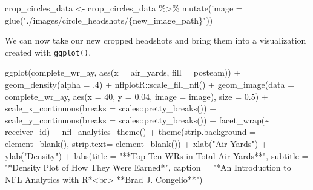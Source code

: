 \documentclass[
  letterpaper,
]{krantz}
\newenvironment{Shaded}{\begin{snugshade}}{\end{snugshade}}
\newcommand{\AttributeTok}[1]{\textcolor[rgb]{0.40,0.45,0.13}{#1}}
\newcommand{\DecValTok}[1]{\textcolor[rgb]{0.68,0.00,0.00}{#1}}
\newcommand{\FloatTok}[1]{\textcolor[rgb]{0.68,0.00,0.00}{#1}}
\newcommand{\FunctionTok}[1]{\textcolor[rgb]{0.28,0.35,0.67}{#1}}
\newcommand{\NormalTok}[1]{\textcolor[rgb]{0.00,0.23,0.31}{#1}}
\newcommand{\OtherTok}[1]{\textcolor[rgb]{0.00,0.23,0.31}{#1}}
\newcommand{\SpecialCharTok}[1]{\textcolor[rgb]{0.37,0.37,0.37}{#1}}
\newcommand{\StringTok}[1]{\textcolor[rgb]{0.13,0.47,0.30}{#1}}
\begin{document}
\begin{Shaded}
\begin{Highlighting}[]
\NormalTok{crop\_circles\_data }\OtherTok{\textless{}{-}}\NormalTok{ crop\_circles\_data }\SpecialCharTok{\%\textgreater{}\%}
  \FunctionTok{mutate}\NormalTok{(}\AttributeTok{image =} \FunctionTok{glue}\NormalTok{(}\StringTok{"./images/circle\_headshots/\{new\_image\_path\}"}\NormalTok{))}
\end{Highlighting}
\end{Shaded}

We can now take our new cropped headshots and bring them into a
visualization created with \texttt{ggplot()}.

\begin{Shaded}
\begin{Highlighting}[]
\FunctionTok{ggplot}\NormalTok{(complete\_wr\_ay, }\FunctionTok{aes}\NormalTok{(}\AttributeTok{x =}\NormalTok{ air\_yards, }\AttributeTok{fill =}\NormalTok{ posteam)) }\SpecialCharTok{+}
  \FunctionTok{geom\_density}\NormalTok{(}\AttributeTok{alpha =}\NormalTok{ .}\DecValTok{4}\NormalTok{) }\SpecialCharTok{+}
\NormalTok{  nflplotR}\SpecialCharTok{::}\FunctionTok{scale\_fill\_nfl}\NormalTok{() }\SpecialCharTok{+}
  \FunctionTok{geom\_image}\NormalTok{(}\AttributeTok{data =}\NormalTok{ complete\_wr\_ay, }\FunctionTok{aes}\NormalTok{(}\AttributeTok{x =} \DecValTok{40}\NormalTok{, }\AttributeTok{y =} \FloatTok{0.04}\NormalTok{,}
                                        \AttributeTok{image =}\NormalTok{ image),}
             \AttributeTok{size =} \FloatTok{0.5}\NormalTok{) }\SpecialCharTok{+}
  \FunctionTok{scale\_x\_continuous}\NormalTok{(}\AttributeTok{breaks =}\NormalTok{ scales}\SpecialCharTok{::}\FunctionTok{pretty\_breaks}\NormalTok{()) }\SpecialCharTok{+}
  \FunctionTok{scale\_y\_continuous}\NormalTok{(}\AttributeTok{breaks =}\NormalTok{ scales}\SpecialCharTok{::}\FunctionTok{pretty\_breaks}\NormalTok{()) }\SpecialCharTok{+}
  \FunctionTok{facet\_wrap}\NormalTok{(}\SpecialCharTok{\textasciitilde{}}\NormalTok{ receiver\_id) }\SpecialCharTok{+}
  \FunctionTok{nfl\_analytics\_theme}\NormalTok{() }\SpecialCharTok{+}
  \FunctionTok{theme}\NormalTok{(}\AttributeTok{strip.background =} \FunctionTok{element\_blank}\NormalTok{(),}
        \AttributeTok{strip.text=} \FunctionTok{element\_blank}\NormalTok{()) }\SpecialCharTok{+}
  \FunctionTok{xlab}\NormalTok{(}\StringTok{"Air Yards"}\NormalTok{) }\SpecialCharTok{+}
  \FunctionTok{ylab}\NormalTok{(}\StringTok{"Density"}\NormalTok{) }\SpecialCharTok{+}
  \FunctionTok{labs}\NormalTok{(}\AttributeTok{title =} \StringTok{"**Top Ten WRs in Total Air Yards**"}\NormalTok{,}
       \AttributeTok{subtitle =} \StringTok{"*Density Plot of How They Were Earned*"}\NormalTok{,}
       \AttributeTok{caption =} \StringTok{"*An Introduction to NFL Analytics with R*\textless{}br\textgreater{}}
\StringTok{       **Brad J. Congelio**"}\NormalTok{)}
\end{Highlighting}
\end{Shaded}
\end{document}
